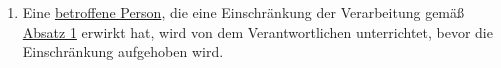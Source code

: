 \begin{enumerate}
  \item Eine \hyperref[itm:04-1]{betroffene Person}, die eine Einschränkung der Verarbeitung gemäß \hyperref[itm:18-1]{Absatz 1} erwirkt hat,
   wird von dem Verantwortlichen unterrichtet, bevor die Einschränkung aufgehoben wird.
  \label{itm:18-3}

\end{enumerate}


